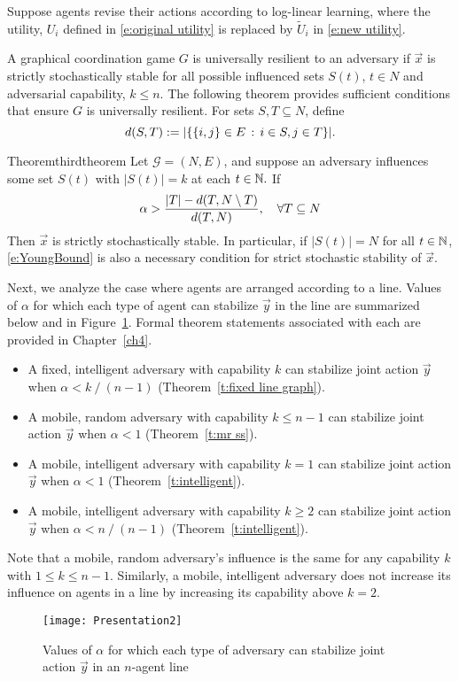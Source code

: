 Suppose agents revise their actions according to log-linear learning, where the utility, $U_i$ defined in \eqref{e:original utility} is replaced by $\tilde{U}_i$ in \eqref{e:new utility}. 

A graphical coordination game $G$ is universally resilient to an adversary if $\vec{x}$ is strictly stochastically stable for all possible influenced sets $S(t)$, $t\in N$ and adversarial capability, $k\leq n.$ The following theorem provides sufficient conditions that ensure $G$ is universally resilient. For sets $S,T\subseteq N$, define
$$d(S,T) := |\{\{i,j\}\in E\,:\, i\in S, j\in T\}|.$$

\begin{restatable}{Theorem}{thirdtheorem}\label{t:A stable all}
Let $\mathcal{G} = (N,E)$, and suppose an adversary influences some set $S(t)$ with $|S(t)| = k$ at each $t\in\mathbb{N}.$ If
\begin{equation}\label{e:YoungBound}
\alpha > {|T| - d(T,N\setminus T)\over d(T,N)},\quad\forall T\subseteq N
\end{equation}
Then $\vec{x}$ is strictly stochastically stable. In particular, if $|S(t)| = N$ for all $t\in \mathbb{N}$, \eqref{e:YoungBound} is also a necessary condition for strict stochastic stability of $\vec{x}$. 
\end{restatable}

Next, we analyze the case where agents are arranged according to a line. Values of $\alpha$ for which each type of agent can stabilize $\vec{y}$ in the line are summarized below and in Figure~\ref{f:barGraph}. Formal theorem statements associated with each are provided in Chapter~\ref{ch4}.
\begin{itemize}
\item A fixed, intelligent adversary with capability $k$ can stabilize joint action $\vec{y}$ when $\alpha<k\mathop{/}(n-1)$ (Theorem~\ref{t:fixed line graph}).
\item A mobile, random adversary with capability $k\leq n-1$ can stabilize joint action $\vec{y}$ when $\alpha <1$ (Theorem~\ref{t:mr ss}).
\item A mobile, intelligent adversary with capability $k=1$ can stabilize joint action $\vec{y}$ when $\alpha <1$ (Theorem~\ref{t:intelligent}).
\item A mobile, intelligent adversary with capability $k\geq 2$ can stabilize joint action $\vec{y}$ when $\alpha <n\mathop{/}(n-1)$ (Theorem~\ref{t:intelligent}).
\end{itemize}
Note that a mobile, random adversary's influence is the same for any capability $k$ with $1\leq k\leq n-1.$ Similarly, a mobile, intelligent adversary does not increase its influence on agents in a line by increasing its capability above $k=2.$

\begin{figure}[!]
  \centering
    \texttt{[image: Presentation2]}
  \caption{Values of $\alpha$ for which each type of adversary can stabilize joint action $\vec{y}$ in an $n$-agent line}\label{f:barGraph}
\end{figure}


